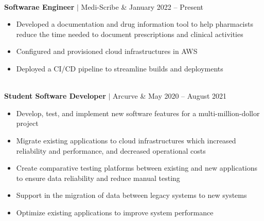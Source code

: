 \documentclass[11pt]{article}
\newenvironment{compactList}
{
  \begin{itemize}
    \setlength{\itemsep}{0pt}
    \setlength{\parskip}{0pt}
}
{\end{itemize}}
\begin{document}
\begin{tabularx}{\textwidth\setlength{\extrarowheight}{5pt}}
{\begin{minipage}{0.85\paperwidth}
    \end{minipage}
  }
  \\
  \textbf{Softwarae Engineer} $\vert$ Medi-Scribe               & January 2022 – Present \\
  {
    \begin{minipage}{0.85\paperwidth}
      \begin{compactList}
        \item Developed a documentation and drug information tool to help pharmacists reduce the time needed to document prescriptions and clinical activities
        \item Configured and provisioned cloud infrastructures in AWS
        \item Deployed a CI/CD pipeline to streamline builds and deployments
      \end{compactList}
    \end{minipage}
  }
  \\
  \textbf{Student Software Developer} $\vert$ Arcurve                     & May 2020 – August 2021 \\
  {
    \begin{minipage}{0.85\paperwidth}
      \begin{compactList}
        \item Develop, test, and implement new software features for a multi-million-dollor project
        \item Migrate existing applications to cloud infrastructures which increased reliability and performance, and decreased operational costs
        \item Create comparative testing platforms between existing and new applications to ensure data reliability and reduce manual testing
        \item Support in the migration of data between legacy systems to new systems
        \item Optimize existing applications to improve system performance
      \end{compactList}
    \end{minipage}
  }
\end{tabularx}
\vspace{-10pt}
\end{document}

